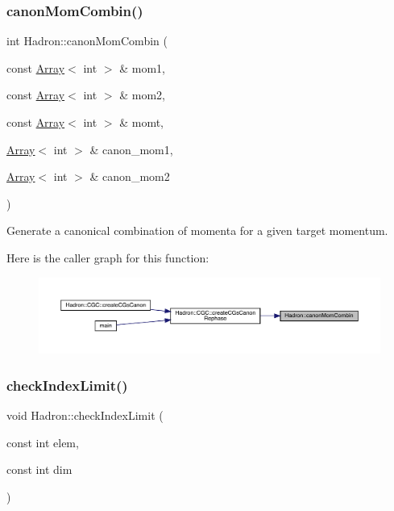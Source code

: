\subsubsection{\texorpdfstring{canonMomCombin()}{canonMomCombin()}}
{\footnotesize\ttfamily int Hadron\+::canon\+Mom\+Combin (\begin{DoxyParamCaption}\item[{const \mbox{\hyperlink{classXMLArray_1_1Array}{Array}}$<$ int $>$ \&}]{mom1,  }\item[{const \mbox{\hyperlink{classXMLArray_1_1Array}{Array}}$<$ int $>$ \&}]{mom2,  }\item[{const \mbox{\hyperlink{classXMLArray_1_1Array}{Array}}$<$ int $>$ \&}]{momt,  }\item[{\mbox{\hyperlink{classXMLArray_1_1Array}{Array}}$<$ int $>$ \&}]{canon\+\_\+mom1,  }\item[{\mbox{\hyperlink{classXMLArray_1_1Array}{Array}}$<$ int $>$ \&}]{canon\+\_\+mom2 }\end{DoxyParamCaption})}



Generate a canonical combination of momenta for a given target momentum. 

Here is the caller graph for this function\+:\nopagebreak
\begin{figure}[H]
\begin{center}
\leavevmode
\includegraphics[width=350pt]{d1/daf/namespaceHadron_ab874ef7e96f2c243de41a6ef639bf3c3_icgraph}
\end{center}
\end{figure}
\mbox{\label{namespaceHadron_a32841ac341a167a00453d3846a386fd9}} 
\subsubsection{\texorpdfstring{checkIndexLimit()}{checkIndexLimit()}}
{\footnotesize\ttfamily void Hadron\+::check\+Index\+Limit (\begin{DoxyParamCaption}\item[{const int}]{elem,  }\item[{const int}]{dim }\end{DoxyParamCaption})}



